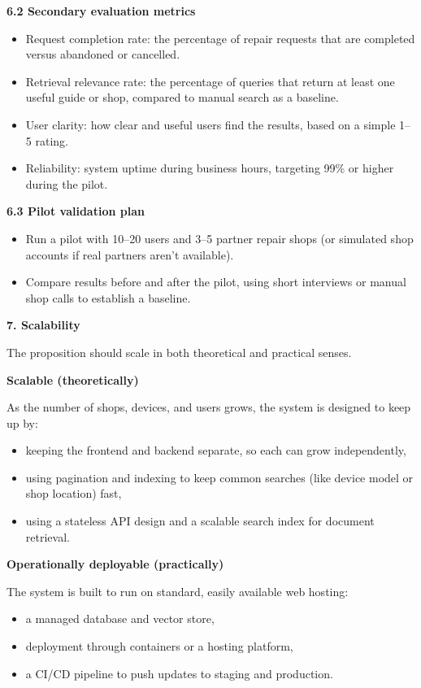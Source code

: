 \documentclass[11pt]{article}
\newcommand{\sechead}[2]{%
  \vspace{0.35cm}\noindent
  {\large\bfseries #1}\hfill{\large\itshape #2}\par
  \vspace{0.15cm}
}
\newcommand{\secheadonly}[1]{%
  \vspace{0.35cm}\noindent
  {\large\bfseries #1}\par
  \vspace{0.15cm}
}
\begin{document}
\secheadonly{6.2 Secondary evaluation metrics}
\begin{itemize}
  \item Request completion rate: the percentage of repair requests that are completed versus abandoned or cancelled.
  \item Retrieval relevance rate: the percentage of queries that return at least one useful guide or shop, compared to manual search as a baseline.
  \item User clarity: how clear and useful users find the results, based on a simple 1--5 rating.
  \item Reliability: system uptime during business hours, targeting 99\% or higher during the pilot.
\end{itemize}

\sechead{6.3 Pilot validation plan}{}
\begin{itemize}
  \item Run a pilot with 10--20 users and 3--5 partner repair shops (or simulated shop accounts if real partners aren't available).
  \item Compare results before and after the pilot, using short interviews or manual shop calls to establish a baseline.
\end{itemize}

\sechead{7. Scalability}{}
The proposition should scale in both theoretical and practical senses.

\secheadonly{Scalable (theoretically)}{}
As the number of shops, devices, and users grows, the system is designed to keep up by:
\begin{itemize}
  \item keeping the frontend and backend separate, so each can grow independently,
  \item using pagination and indexing to keep common searches (like device model or shop location) fast,
  \item using a stateless API design and a scalable search index for document retrieval.
\end{itemize}

\secheadonly{Operationally deployable (practically)}{}
The system is built to run on standard, easily available web hosting:
\begin{itemize}
  \item a managed database and vector store,
  \item deployment through containers or a hosting platform,
  \item a CI/CD pipeline to push updates to staging and production.
\end{itemize}
\end{document}
